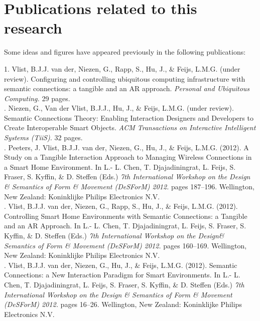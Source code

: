 \cleardoublepage
\chapter*{Publications related to this research}

Some ideas and figures have appeared previously in the following publications:

\bigskip

1. Vlist, B.J.J. van der, Niezen, G., Rapp, S., Hu, J., \& Feijs, L.M.G.  (under review). Configuring and controlling ubiquitous computing infrastructure with semantic connections: a tangible and an AR approach. \emph{Personal and Ubiquitous Computing.} 29 pages. \\

. Niezen, G., Van der Vlist, B.J.J., Hu, J., \& Feijs, L.M.G.  (under review). Semantic Connections Theory: Enabling Interaction Designers and Developers to Create Interoperable Smart Objects. \emph{ACM Transactions on Interactive Intelligent Systems (TiiS).} 32 pages. \\

. Peeters, J. Vlist, B.J.J. van der, Niezen, G., Hu, J., \& Feijs, L.M.G. (2012). A Study on a Tangible Interaction Approach to Managing Wireless Connections in a Smart Home Environment.  In L.- L. Chen, T. Djajadiningrat, L. Feijs, S. Fraser, S. Kyffin, \&  D. Steffen (Eds.) \emph{7th International Workshop on the Design \& Semantics of Form \& Movement (DeSForM) 2012.} pages 187--196. Wellington, New Zealand: Koninklijke Philips Electronics N.V.\\

. Vlist, B.J.J. van der, Niezen, G., Rapp, S., Hu, J., \& Feijs, L.M.G. (2012). Controlling Smart Home Environments with Semantic Connections: a Tangible and an AR Approach. In L.- L. Chen, T. Djajadiningrat, L. Feijs, S. Fraser, S. Kyffin, \&  D. Steffen (Eds.) \emph{7th International Workshop on the Design\& Semantics of Form \& Movement (DeSForM) 2012.} pages 160--169.  Wellington, New Zealand: Koninklijke Philips Electronics N.V.\\

. Vlist, B.J.J. van der, Niezen, G., Hu, J., \& Feijs, L.M.G. (2012). Semantic Connections: a New Interaction Paradigm for Smart Environments. In L.- L. Chen, T. Djajadiningrat, L. Feijs, S. Fraser, S. Kyffin, \&  D. Steffen (Eds.) \emph{7th International Workshop on the Design \& Semantics of Form \& Movement (DeSForM) 2012.} pages 16--26. Wellington, New Zealand: Koninklijke Philips Electronics N.V.\\

